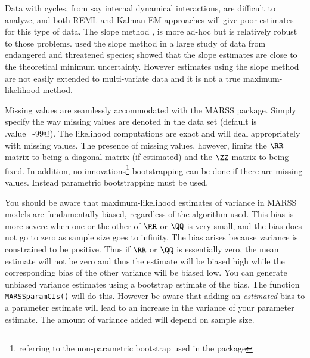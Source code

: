 Data with cycles, from say internal dynamical interactions, are difficult to analyze, and both REML and Kalman-EM approaches will give poor estimates for this type of data.  The slope method \citep{Holmes2001}, is more ad-hoc but is relatively robust to those problems.  \citet{Holmesetal2007} used the slope method in a large study of data from endangered and threatened species; \citet{EllnerHolmes2008}  showed that the slope estimates are close to the theoretical minimum uncertainty.  However estimates using the slope method are not easily extended to multi-variate data and it is not a true maximum-likelihood method. 

Missing values are seamlessly accommodated with the MARSS package.  Simply specify the way missing values are denoted in the data set (default is \verb@miss.value=-99@).  The likelihood computations are exact and will deal appropriately with missing values.  The presence of missing values, however, limits the $\RR$ matrix to being a diagonal matrix (if estimated) and the $\ZZ$ matrix to being fixed.  In addition, no innovations\footnote{referring to the non-parametric bootstrap used in the package} bootstrapping can be done if there are missing values.  Instead parametric bootstrapping must be used.

You should be aware that maximum-likelihood estimates of variance in MARSS models are fundamentally biased, regardless of the algorithm used.  This bias is more severe when one or the other of $\RR$ or $\QQ$ is very small, and the bias does not go to zero as sample size goes to infinity.  The bias arises because variance is constrained to be positive.  Thus if $\RR$ or $\QQ$ is essentially zero, the mean estimate will not be zero and thus the estimate  will be biased high while the corresponding bias of the other variance will be biased low.  You can generate unbiased variance estimates using a bootstrap estimate of the bias.  The function \texttt{MARSSparamCIs()} will do this.  However be aware that adding an {\it estimated} bias to a parameter estimate will lead to an increase in the variance of your parameter estimate.  The amount of variance added will depend on sample size.

